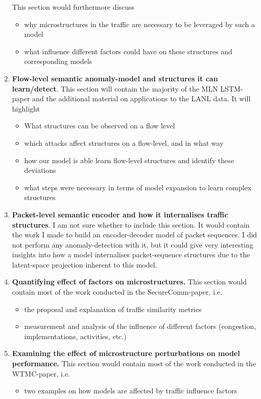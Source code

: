 \documentclass[a4paper,12pt,twoside]{article}
\begin{document}
\begin{enumerate}
This section would furthermore discuss 

\begin{itemize}
 \item why microstructures in the traffic are necessary to be leveraged by such a model
 \item what influence different factors could have on these structures and corresponding models
 \end{itemize}



\item \textbf{Flow-level semantic anomaly-model and structures it can learn/detect}.
This section will contain the majority of the MLN LSTM-paper and the additional material on applications to the LANL data. It will highlight
 \begin{itemize}
 \item What structures can be observed on a flow level
 \item which attacks affect structures on a flow-level, and in what way
\item how our model is able learn flow-level structures and identify these deviations
\item what steps were necessary in terms of model expansion to learn complex structures
 \end{itemize}

\item \textbf{Packet-level semantic encoder and how it internalises traffic structures}.
I am not sure whether to include this section. It would contain the work I made to build an encoder-decoder model of packet sequences. I did not perform any anomaly-detection with it, but it could give very interesting insights into how a model internalises packet-sequence structures due to the latent-space projection inherent to this model.

\item \textbf{Quantifying effect of factors on microstructures.}
This section would contain most of the work conducted in the SecureComm-paper, i.e.
 \begin{itemize}
 \item the proposal and explanation of traffic similarity metrics
 \item measurement and analysis of the influence of different factors (congestion, implementations, activities, etc.)
 \end{itemize}

\item \textbf{Examining the effect of microstructure perturbations on model performance.}
This section would contain most of the work conducted in the WTMC-paper, i.e.
 \begin{itemize}
 \item two examples on how models are affected by traffic influence factors
 \end{itemize}


\end{enumerate}
\end{document}
